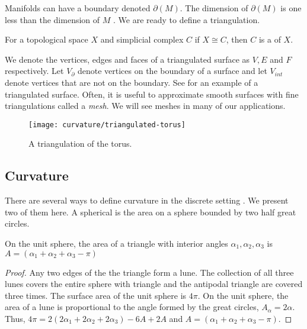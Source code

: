 Manifolds can have a boundary denoted $\partial(M)$.
The dimension of $\partial(M)$ is one less than the dimension of $M$ .
We are ready to define a triangulation.

\begin{definition}[Triangulation]
For a topological space $X$ and simplicial complex $C$ if $X\cong C$,
then $C$  is a  of $X$.
\end{definition}

We denote the vertices, edges and faces of a triangulated surface as $V, E$ and $F$ respectively.
Let $V_{\partial}$ denote vertices on the boundary of a surface and let $V_{int}$ 
denote vertices that are not on the boundary.
See  for an example of a triangulated surface.
Often, it is useful to approximate smooth surfaces with fine triangulations called
a \emph{mesh}. We will see meshes in many of our applications.


\begin{figure}[htb]
\centering
\texttt{[image: curvature/triangulated-torus]}
\caption{A triangulation of the torus.}
\label{fig:triangulated-torus}
\end{figure}

\subsection{Curvature}

There are several ways to define curvature in the discrete setting \cite{Crane:2013}.
We present two of them here. 
A spherical  is the area on a sphere bounded by two half great circles.


\begin{lemma}\label{lem:spherical-triangle}
On the unit sphere, the area of a triangle with interior angles $\alpha_1, \alpha_2, \alpha_3$
is $A=(\alpha_1+\alpha_2+\alpha_3-\pi)$
\end{lemma}

\begin{proof}
Any two edges of the the triangle form a lune. The collection of 
all three lunes covers the entire sphere with triangle and the antipodal triangle
are covered three times. The surface area of the unit sphere is $4\pi$.
On the unit sphere, the area of a lune is proportional to the angle formed
by the great circles, $A_\alpha=2\alpha$.
Thus, $4\pi=2(2\alpha_1+2\alpha_2+2\alpha_3)-6A+2A$
and $A=(\alpha_1+\alpha_2+\alpha_3-\pi)$.
\end{proof}

